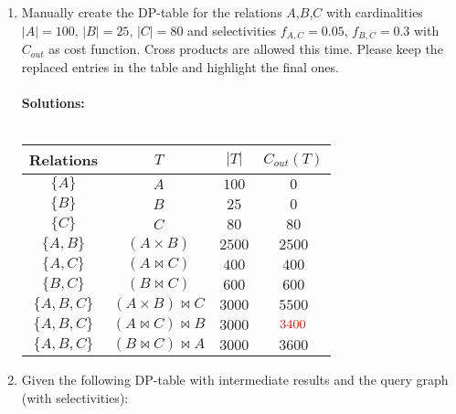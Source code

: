 \begin{enumerate}
  \item
        Manually create the DP-table for the relations $A$,$B$,$C$ with cardinalities $|A|=100$, $|B|=25$, $|C|=80$ and selectivities $f_{A,C}=0.05$,
        $f_{B,C}=0.3$ with $C_{out}$ as cost function.
        Cross products are allowed this time.
        Please keep the replaced entries in the table and highlight the final ones.\\\\
        {\bf Solutions:}\\\\
        \begin{tabular}{|c|c|c|c|} \hline
          {\bf Relations}   & $T$                     & $|T|$   & $C_{out}(T)$            \\ \hline \hline
          $\{A\}$           & $A$                     & $100$   & $0$                     \\ \hline 
          $\{B\}$           & $B$                     & $25$    & $0$                     \\ \hline 
          $\{C\}$           & $C$                     & $80$    & $80$                    \\ \hline 
          $\{A,B\}$         & $(A \times B)$          & $2500$  & $2500$                  \\ \hline 
          $\{A,C\}$         & $(A \Join C)$           & $400$   & $400$                   \\ \hline 
          $\{B,C\}$         & $(B \Join C)$           & $600$   & $600$                   \\ \hline 
          $\{A,B,C\}$       & $(A \times B) \Join C$  & $3000$  & $5500$                  \\ \hline 
          $\{A,B,C\}$       & $(A \Join C) \Join B$   & $3000$  & $\textcolor{red}{3400}$ \\ \hline 
          $\{A,B,C\}$       & $(B \Join C) \Join A$   & $3000$   & $3600$                 \\ \hline 
        \end{tabular}
        \newpage
  \item
        Given the following DP-table with intermediate results and the query graph (with selectivities):


\end{enumerate}
